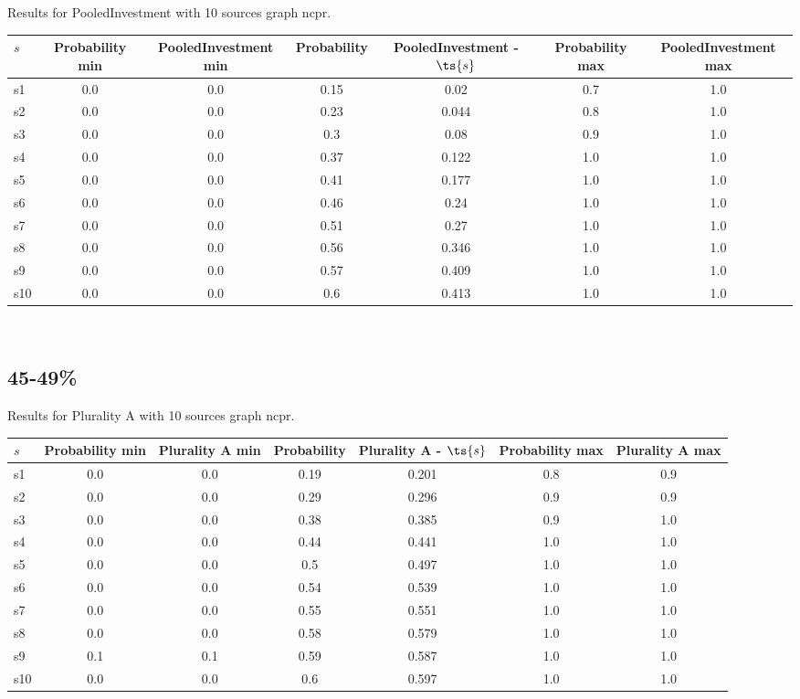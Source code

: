 \documentclass{article}
\begin{document}
\noindent Results for PooledInvestment with 10 sources graph ncpr.

\noindent\begin{tabular}{|l|c|c|c|c|c|c|}
\hline
$s$& Probability min & PooledInvestment min & Probability & PooledInvestment - $\ts{s}$ & Probability max & PooledInvestment max\\
\hline
s1 &0.0 & 0.0 & 0.15 & 0.02 & 0.7 & 1.0\\
\hline
s2 &0.0 & 0.0 & 0.23 & 0.044 & 0.8 & 1.0\\
\hline
s3 &0.0 & 0.0 & 0.3 & 0.08 & 0.9 & 1.0\\
\hline
s4 &0.0 & 0.0 & 0.37 & 0.122 & 1.0 & 1.0\\
\hline
s5 &0.0 & 0.0 & 0.41 & 0.177 & 1.0 & 1.0\\
\hline
s6 &0.0 & 0.0 & 0.46 & 0.24 & 1.0 & 1.0\\
\hline
s7 &0.0 & 0.0 & 0.51 & 0.27 & 1.0 & 1.0\\
\hline
s8 &0.0 & 0.0 & 0.56 & 0.346 & 1.0 & 1.0\\
\hline
s9 &0.0 & 0.0 & 0.57 & 0.409 & 1.0 & 1.0\\
\hline
s10 &0.0 & 0.0 & 0.6 & 0.413 & 1.0 & 1.0\\
\hline
\end{tabular}\\

\newpage

\subsection{45-49\%}

\noindent Results for Plurality A with 10 sources graph ncpr.

\noindent\begin{tabular}{|l|c|c|c|c|c|c|}
\hline
$s$& Probability min & Plurality A min & Probability & Plurality A - $\ts{s}$ & Probability max & Plurality A max\\
\hline
s1 &0.0 & 0.0 & 0.19 & 0.201 & 0.8 & 0.9\\
\hline
s2 &0.0 & 0.0 & 0.29 & 0.296 & 0.9 & 0.9\\
\hline
s3 &0.0 & 0.0 & 0.38 & 0.385 & 0.9 & 1.0\\
\hline
s4 &0.0 & 0.0 & 0.44 & 0.441 & 1.0 & 1.0\\
\hline
s5 &0.0 & 0.0 & 0.5 & 0.497 & 1.0 & 1.0\\
\hline
s6 &0.0 & 0.0 & 0.54 & 0.539 & 1.0 & 1.0\\
\hline
s7 &0.0 & 0.0 & 0.55 & 0.551 & 1.0 & 1.0\\
\hline
s8 &0.0 & 0.0 & 0.58 & 0.579 & 1.0 & 1.0\\
\hline
s9 &0.1 & 0.1 & 0.59 & 0.587 & 1.0 & 1.0\\
\hline
s10 &0.0 & 0.0 & 0.6 & 0.597 & 1.0 & 1.0\\
\hline
\end{tabular}\\
\end{document}
